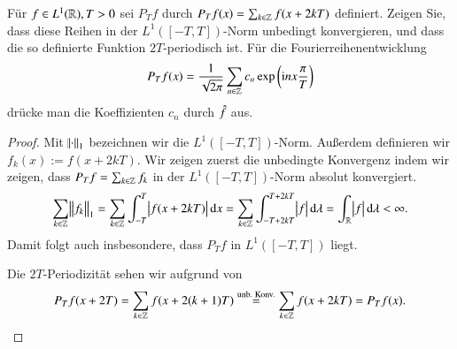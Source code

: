 
\begin{exercise}
  Für $f \in L^1(\mathbb{R}), T>0$ sei $P_T f$ durch $P_T f(x)=\sum_{k \in \mathbb{Z}}{f(x+2kT)}$ definiert. Zeigen Sie, dass diese Reihen in der $L^1([-T,T])$-Norm unbedingt konvergieren, und dass die so definierte Funktion $2T$-periodisch ist. Für die Fourierreihenentwicklung
  \begin{equation*}
    P_T f(x)=\frac{1}{\sqrt{2\pi}} \sum_{n \in \mathbb{Z}}{c_n \exp\left(\mathrm{i} n x \frac{\pi}{T}\right)}
  \end{equation*}
  drücke man die Koeffizienten $c_n$ durch $\hat{f}$ aus.
\end{exercise}

\begin{proof}
   Mit $\norm{\cdot}_1$ bezeichnen wir die $L^1([-T,T])$-Norm. Außerdem definieren wir $f_k(x):=f(x+2kT)$. Wir zeigen zuerst die unbedingte Konvergenz indem wir zeigen, dass $P_T f = \sum_{k \in \mathbb{Z}}{f_k}$ in der $L^1([-T,T])$-Norm absolut konvergiert.
   \begin{equation}
     \label{eq:absolute-convergence}
     \sum_{k \in \Z}{\norm{f_k}_1}=\sum_{k \in \Z}{\int_{-T}^T{\abs{f(x+2kT)} \dif x}}
     = \sum_{k \in \Z}{\int_{-T+2kT}^{T+2kT}{\abs{f} \dif \lambda}}
     = \int_\R{\abs{f} \dif \lambda}
     < \infty.
   \end{equation}
  Damit folgt auch insbesondere, dass $P_T f$ in $L^1([-T,T])$ liegt.

  Die $2T$-Periodizität sehen wir aufgrund von
  \begin{equation*}
    P_T f(x + 2T) = \sum_{k \in \mathbb{Z}}{f(x + 2(k+1)T)} \stackrel{\text{unb. Konv.}}{=} \sum_{k \in \mathbb{Z}}{f(x + 2kT)} = P_T f(x).
  \end{equation*}


\end{proof}
